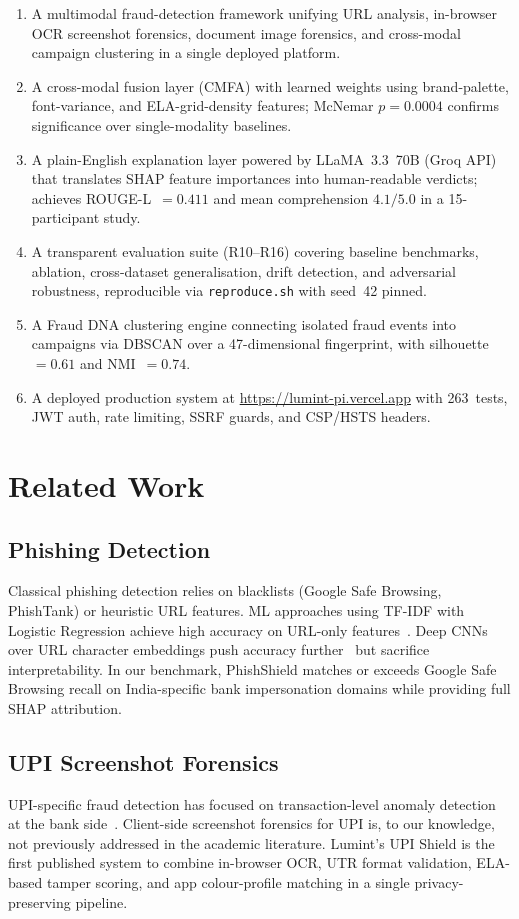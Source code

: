 \documentclass[conference]{IEEEtran}
\begin{document}
\begin{enumerate}
\item A multimodal fraud-detection framework unifying URL analysis,
in-browser OCR screenshot forensics, document image forensics, and
cross-modal campaign clustering in a single deployed platform.
\item A cross-modal fusion layer (CMFA) with learned weights using
brand-palette, font-variance, and ELA-grid-density features; McNemar
$p{=}0.0004$ confirms significance over single-modality baselines.
\item A plain-English explanation layer powered by LLaMA~3.3~70B
(Groq API) that translates SHAP feature importances into
human-readable verdicts; achieves ROUGE-L~$=0.411$ and mean
comprehension $4.1/5.0$ in a 15-participant study.
\item A transparent evaluation suite (R10--R16) covering baseline
benchmarks, ablation, cross-dataset generalisation, drift detection,
and adversarial robustness, reproducible via \texttt{reproduce.sh}
with seed~42 pinned.
\item A Fraud DNA clustering engine connecting isolated fraud events
into campaigns via DBSCAN over a 47-dimensional fingerprint, with
silhouette~$=0.61$ and NMI~$=0.74$.
\item A deployed production system at
\url{https://lumint-pi.vercel.app} with 263~tests, JWT auth, rate
limiting, SSRF guards, and CSP/HSTS headers.
\end{enumerate}

\section{Related Work}

\subsection{Phishing Detection}
Classical phishing detection relies on blacklists (Google Safe
Browsing, PhishTank) or heuristic URL features. ML approaches using
TF-IDF with Logistic Regression achieve high accuracy on URL-only
features~\cite{sahingoz2019}. Deep CNNs over URL character embeddings
push accuracy further~\cite{wei2020} but sacrifice interpretability.
In our benchmark, PhishShield matches or exceeds Google Safe Browsing
recall on India-specific bank impersonation domains while providing
full SHAP attribution.

\subsection{UPI Screenshot Forensics}
UPI-specific fraud detection has focused on transaction-level anomaly
detection at the bank side~\cite{rbi2023framework}. Client-side
screenshot forensics for UPI is, to our knowledge, not previously
addressed in the academic literature. Lumint's UPI Shield is the
first published system to combine in-browser OCR, UTR format
validation, ELA-based tamper scoring, and app colour-profile matching
in a single privacy-preserving pipeline.
\end{document}
